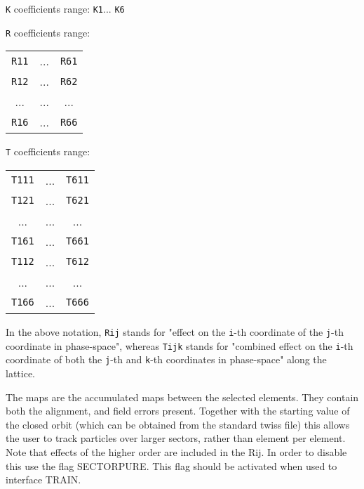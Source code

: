 

\texttt{K} coefficients range: 
\texttt{K1}... 
\texttt{K6}


\texttt{R} coefficients range: 
\begin{tabular}{ccc}
\texttt{R11} & ... & \texttt{R61} \\ 
\texttt{R12} & ... & \texttt{R62} \\ 
... & ... & ... \\ 
\texttt{R16} & ... & \texttt{R66}
\end{tabular}


\texttt{T} coefficients range: 
\begin{tabular}{ccc}
\texttt{T111} & ... &\texttt{T611} \\ 
\texttt{T121} & ... & \texttt{T621} \\ 
... & ... & ... \\ 
\texttt{T161} & ... & \texttt{T661} \\ 
\texttt{T112} & ... & \texttt{T612} \\ 
... & ... & ... \\ 
\texttt{T166} & ... & \texttt{T666}
\end{tabular}

 In the above notation, 
\texttt{Rij} stands for "effect on the 
\texttt{i}-th coordinate of the 
\texttt{j}-th coordinate in phase-space", whereas 
\texttt{Tijk} stands for "combined effect on the 
\texttt{i}-th coordinate of both the 
\texttt{j}-th and 
\texttt{k}-th coordinates in phase-space" along the lattice. 

% 
% 
% 
% 
% 
% 
% 
   
The maps are the accumulated maps between the selected elements. They
contain both the alignment, and field errors present. Together with the
starting value of the closed orbit (which can be obtained from the
standard twiss file) this allows the user to track particles over larger
sectors, rather than element per element. Note that effects of the higher order
are included in the Rij. In order to disable this use the flag SECTORPURE. 
This flag should be activated when used to interface TRAIN.  



